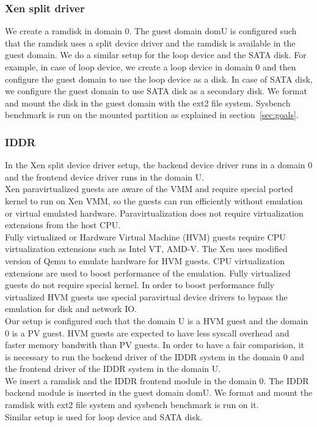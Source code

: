 \subsubsection*{Xen split driver}
We create a ramdisk in domain 0. The guest domain domU is configured such that the ramdisk uses a split device driver and the ramdisk is available in the guest domain. We do a similar setup for the loop device and the SATA disk. For example, in case of loop device, we create a loop device in domain 0 and then configure the guest domain to use the loop device as a disk. In case of SATA disk, we configure the guest domain to use SATA disk as a secondary disk. We format and mount the disk in the guest domain with the ext2 file system. Sysbench benchmark is run on the mounted partition as explained in section~\ref{sec:goals}.

\subsubsection*{IDDR}
In the Xen split device driver setup, the backend device driver runs in a domain 0 and the frontend device driver runs in the domain U. 
\\[3mm]
Xen paravirtualized guests are aware of the VMM and require special ported kernel to run on Xen VMM, so the guests can run efficiently without emulation or virtual emulated hardware. Paravirtualization does not require virtualization extensions from the host CPU. 
\\[3mm]
Fully virtualized or Hardware Virtual Machine (HVM) guests require CPU virtualization extensions such as Intel VT, AMD-V. The Xen uses modified version of Qemu to emulate hardware for HVM guests. CPU virtualization extensions are used to boost performance of the emulation. Fully virtualized guests do not require special kernel. In order to boost performance fully virtualized HVM guests use special paravirtual device drivers to bypass the emulation for disk and network IO.
\\[3mm]
Our setup is configured such that the domain U is a HVM guest and the domain 0 is a PV guest. HVM guests are expected to have less syscall overhead and faster memory bandwith than PV guests. In order to have a fair comparision, it is necessary to run the backend driver of the IDDR system in the domain 0 and the frontend driver of the IDDR system in the domain U.
\\[3mm]
We insert a ramdisk and the IDDR frontend module in the domain 0. The IDDR backend module is inserted in the guest domain domU. We format and mount the ramdisk with ext2 file system and sysbench benchmark is run on it.  
\\[3mm]
Similar setup is used for loop device and SATA disk.
